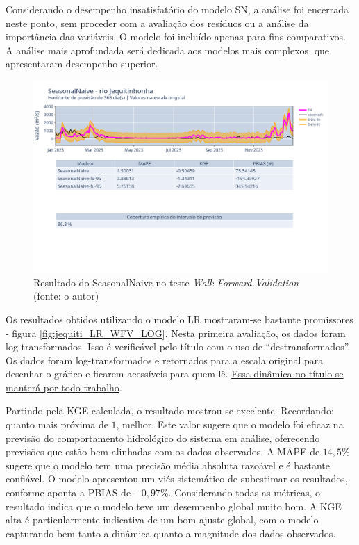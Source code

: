 Considerando o desempenho insatisfatório do modelo SN, a análise foi encerrada neste ponto, sem proceder com a avaliação dos resíduos ou a análise da importância das variáveis. O modelo foi incluído apenas para fins comparativos. A análise mais aprofundada será dedicada aos modelos mais complexos, que apresentaram desempenho superior.

\begin{figure}[!h]
	\centering
	\includegraphics[scale=0.33]{Figuras/jequiti/wfv/SN/SN_WFV_ORIG.png}
	\caption{Resultado do SeasonalNaive no teste \textit{Walk-Forward Validation}\\(fonte: o autor)}
	\label{fig:jequiti_SN_WFV_ORIG}
\end{figure}
\clearpage

Os resultados obtidos utilizando o modelo LR mostraram-se bastante promissores - figura \ref{fig:jequiti_LR_WFV_LOG}. Nesta primeira avaliação, os dados foram log-transformados. Isso é verificável pelo título com o uso de ``destransformados''. Os dados foram log-transformados e retornados para a escala original para desenhar o gráfico e ficarem acessíveis para quem lê. \underline{Essa dinâmica no título se manterá por todo trabalho}.

Partindo pela KGE calculada, o resultado mostrou-se excelente. Recordando: quanto mais próxima de $1$, melhor. Este valor sugere que o modelo foi eficaz na previsão do comportamento hidrológico do sistema em análise, oferecendo previsões que estão bem alinhadas com os dados observados. A MAPE de $14,5\%$ sugere que o modelo tem uma precisão média absoluta razoável e é bastante confiável. O modelo apresentou um viés sistemático de subestimar os resultados, conforme aponta a PBIAS de $-0,97\%$. Considerando todas as métricas, o resultado indica que o modelo teve um desempenho global muito bom. A KGE alta é particularmente indicativa de um bom ajuste global, com o modelo capturando bem tanto a dinâmica quanto a magnitude dos dados observados.

